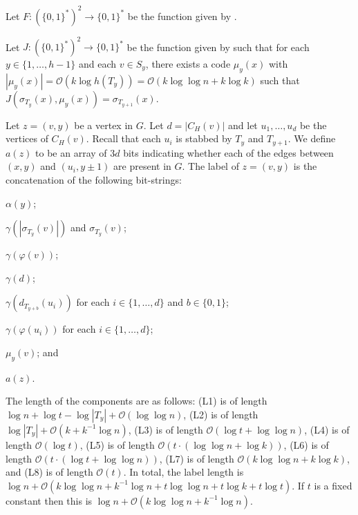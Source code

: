 \documentclass[kpfonts]{patmorin}
\newcommand{\snote}[1]{\fcolorbox{red}{yellow}{#1}}
\newcommand{\Oh}{\mathcal{O}}
\begin{document}

Let $F:(\{0,1\}^{*})^2\to\{0,1\}^*$ be the function given by .


Let $J:(\{0,1\}^{*})^2\to\{0,1\}^*$ be the function given by  such that
for each $y\in\{1,\ldots,h-1\}$ and each $v\in S_{y}$,
there exists a code $\mu_{y}(x)$ with $|\mu_{y}(x)|=\Oh(k\log h(T_{y}))=\Oh(k\log\log n+k \log k)$ such that $J(\sigma_{T_{y}}(x),\mu_{y}(x))=\sigma_{T_{y+1}}(x)$.


Let $z=(v,y)$ be a vertex in $G$.
Let $d = |C_{H}(v)|$ and let $u_1,\ldots,u_d$ be the vertices of $C_H(v)$. 
Recall that each $u_i$ is stabbed by $T_y$ and $T_{y+1}$.
We define $a(z)$ to be an array of $3d$ bits indicating whether 
each of the edges between $(x,y)$ and $(u_i,y\pm1)$ are present in $G$. 
The label of $z=(v,y)$ is the concatenation of the following bit-strings:

\begin{compactenum}[(L1)]
  \item\label{label-alpha} $\alpha(y)$;%
  \item $\gamma(|\sigma_{T_y}(v)|)$ and $\sigma_{T_y}(v)$; %
  \item $\gamma(\varphi(v))$;
  \item $\gamma(d)$;
  \item $\gamma(d_{T_{y+b}}(u_i))$ for each $i\in\{1,\ldots,d\}$ and $b\in\{0,1\}$;
  \item $\gamma(\varphi(u_i))$ for each $i\in\{1,\ldots,d\}$;
  \item $\mu_y(v)$; and
  \item $a(z)$.
  \end{compactenum}
The length of the components are as follows: 
(L1) is of length $\log n + \log t -\log|T_y| + \Oh(\log\log n)$, 
(L2) is of length $\log|T_y| + \Oh(k+k^{-1}\log n)$, 
(L3) is of length $\Oh(\log t + \log\log n)$,
(L4) is of length $\Oh(\log t)$, 
(L5) is of length $\Oh(t\cdot (\log\log n + \log k))$, %
(L6) is of length $\Oh(t\cdot (\log t + \log\log n))$, 
(L7) is of length $\Oh(k\log\log n + k\log k)$, and 
(L8) is of length $\Oh(t)$.
In total, the label length is $\log n + \Oh(k\log\log n+k^{-1}\log n + t \log\log n + t \log k + t \log t)$.
If $t$ is a fixed constant then this is  
$\log n + \Oh(k\log\log n+k^{-1}\log n)$.
\end{document}
